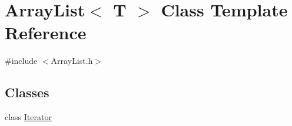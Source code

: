 \hypertarget{class_array_list}{\section{Array\-List$<$ T $>$ Class Template Reference}
\label{class_array_list}
}


{\ttfamily \#include $<$Array\-List.\-h$>$}

\subsection*{Classes}
\begin{DoxyCompactItemize}
\item 
class \hyperlink{class_array_list_1_1_iterator}{Iterator}
\end{DoxyCompactItemize}
